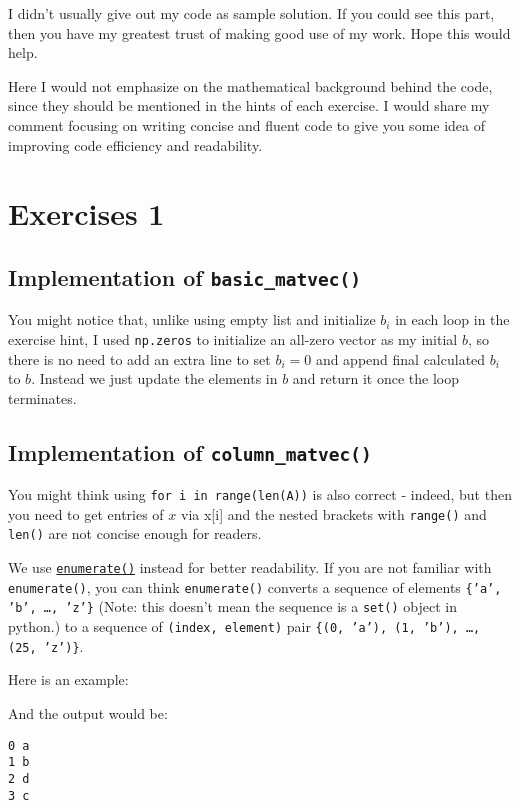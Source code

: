 I didn't usually give out my code as sample solution. If you could see this part, then you have my greatest trust of making good use of my work. Hope this would help. \medskip

\noindent Here I would not emphasize on the mathematical background behind the code, since they should be mentioned in the hints of each exercise. I would share my comment focusing on writing concise and fluent code to give you some idea of improving code efficiency and readability.

\section{Exercises 1}

\subsection{Implementation of \texttt{basic\_matvec()}}

You might notice that, unlike using empty list and initialize \(b_i\) in each loop in the exercise hint, I used \texttt{np.zeros} to initialize an all-zero vector as my initial \(b\), so there is no need to add an extra line to set \(b_i = 0\) and append final calculated \(b_i\) to \(b\). Instead we just update the elements in \(b\) and return it once the loop terminates.
\newpage
\subsection{Implementation of \texttt{column\_matvec()}}

You might think using \texttt{for i in range(len(A))} is also correct - indeed, but then you need to get entries of \(x\) via x[i] and the nested brackets with \texttt{range()} and \texttt{len()} are not concise enough for readers.
\medskip

\noindent 
We use \href{https://realpython.com/python-enumerate/}{\texttt{enumerate()}} instead for better readability. If you are not familiar with \texttt{enumerate()}, you can think \texttt{enumerate()} converts a sequence of elements \texttt{\{'a', 'b', \ldots, 'z'\}} (Note: this doesn't mean the sequence is a \texttt{set()} object in python.) 
to a sequence of \texttt{(index, element)} pair \texttt{\{(0, 'a'), (1, 'b'), \ldots, (25, 'z')\}}. \medskip

\noindent Here is an example:

And the output would be:
\begin{lstlisting}
0 a
1 b
2 d
3 c
\end{lstlisting}
